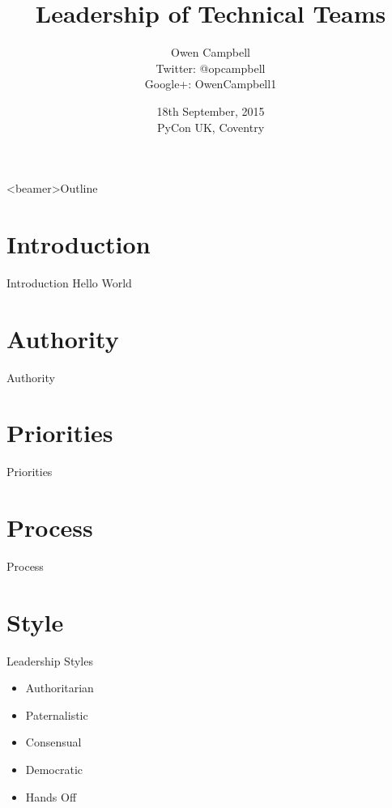 \documentclass[14pt]{beamer}
\title{Leadership of Technical Teams}
\author{
  Owen Campbell\\
  \vspace{1cm}
  Twitter: @opcampbell\\
  Google+: OwenCampbell1
}
\date[PyCon UK 2015]{18th September, 2015\\PyCon UK, Coventry}
\begin{document}
\begin{frame}
  \titlepage{}
\end{frame}

{
  \begin{frame}<beamer>{Outline}
    \tableofcontents
  \end{frame}
}

  \section{Introduction}

    \begin{frame}{Introduction}
      Hello World
    \end{frame}


  \section{Authority}

    \begin{frame}{Authority}
    \end{frame}

  \section{Priorities}

    \begin{frame}{Priorities}
      
    \end{frame}

  \section{Process}

    \begin{frame}{Process}
    \end{frame}

  \section{Style}

    \begin{frame}{Leadership Styles}
      \begin{itemize}
        \item Authoritarian
        \item Paternalistic
        \item Consensual
        \item Democratic
        \item Hands Off
      \end{itemize}
    \end{frame}
\end{document}
